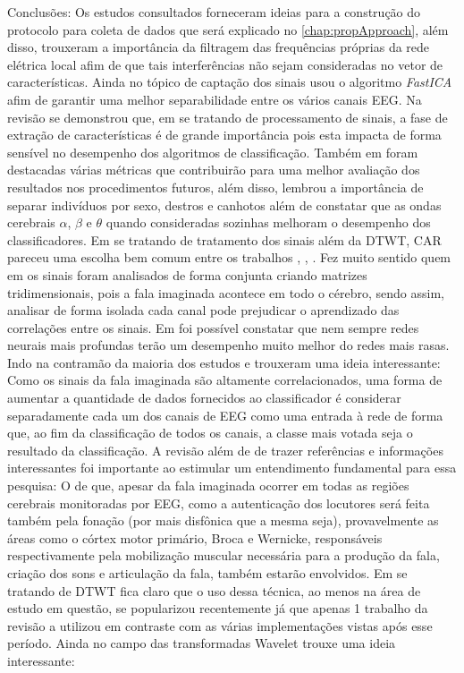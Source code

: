 			\par Conclusões: Os estudos consultados forneceram ideias para a construção do protocolo para coleta de dados que será explicado no \autoref{chap:propApproach}, além disso, trouxeram a importância da filtragem das frequências próprias da rede elétrica local \cite{MahapatraNrushinghCharan2023Ecoi} afim de que tais interferências não sejam consideradas no vetor de características. Ainda no tópico de captação dos sinais \cite{MahapatraNrushinghCharan2022MCoI} usou o algoritmo \textit{FastICA} afim de garantir uma melhor separabilidade entre os vários canais EEG. Na revisão \cite{ShahUzair2022TRoA} se demonstrou que, em se tratando de processamento de sinais, a fase de extração de características é de grande importância pois esta impacta de forma sensível no desempenho dos algoritmos de classificação. Também em \cite{ShahUzair2022TRoA} foram destacadas várias métricas que contribuirão para uma melhor avaliação dos resultados nos procedimentos futuros, além disso, \cite{AgarwalPrabhakar2022Ebia} lembrou a importância de separar indivíduos por sexo, destros e canhotos além de constatar que as ondas cerebrais $\alpha$, $\beta$ e $\theta$ quando consideradas sozinhas melhoram o desempenho dos classificadores. Em se tratando de tratamento dos sinais além da DTWT, CAR pareceu uma escolha bem comum entre os trabalhos \cite{AgarwalPrabhakar2022Ebia}, \cite{Hernandez-Del-ToroTonatiuh2021TaEB}, \cite{MOCTEZUMA2019201}. Fez muito sentido quem em \cite{PanachakelJerrinRamakrishnan} os sinais foram analisados de forma conjunta criando matrizes tridimensionais, pois a fala imaginada acontece em todo o cérebro, sendo assim, analisar de forma isolada cada canal pode prejudicar o aprendizado das correlações entre os sinais. Em \cite{tamm2020classification} foi possível constatar que nem sempre redes neurais mais profundas terão um desempenho muito melhor do redes mais rasas. Indo na contramão da maioria dos estudos \cite{Panachakel_2019} e \cite{panachakel2020novel} trouxeram uma ideia interessante: Como os sinais da fala imaginada são altamente correlacionados, uma forma de aumentar a quantidade de dados fornecidos ao classificador é considerar separadamente cada um dos canais de EEG como uma entrada à rede de forma que, ao fim da classificação de todos os canais, a classe mais votada seja o resultado da classificação. A revisão \cite{s23125575} além de de trazer referências e informações interessantes foi importante ao estimular um entendimento fundamental para essa pesquisa: O de que, apesar da fala imaginada ocorrer em todas as regiões cerebrais monitoradas por EEG, como a autenticação dos locutores será feita também pela fonação (por mais disfônica que a mesma seja), provavelmente as áreas como o córtex motor primário, Broca e Wernicke, responsáveis respectivamente pela mobilização muscular necessária para a produção da fala, criação dos sons e articulação da fala, também estarão envolvidos. Em se tratando de DTWT fica claro que o uso dessa técnica, ao menos na área de estudo em questão, se popularizou recentemente já que apenas 1 trabalho da revisão a utilizou em contraste com as várias implementações vistas após esse período. Ainda no campo das transformadas Wavelet \cite{math11194205} trouxe uma ideia interessante: 